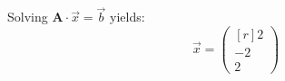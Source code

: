 Solving $\symbf{A} \cdot \vec{x} = \vec{b}$ yields:
\begin{equation}
    \vec{x} = 
    \begin{pmatrix*}[r]
        2 \\ -2 \\ 2
    \end{pmatrix*}
\end{equation}
